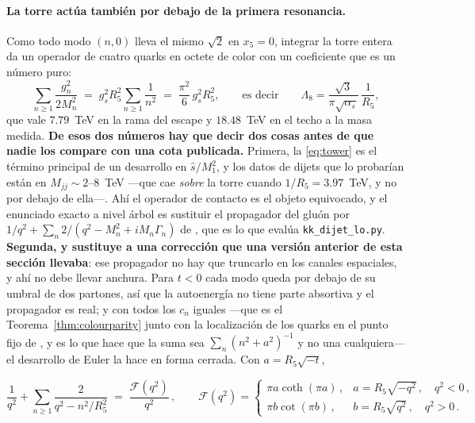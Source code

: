 \documentclass[11pt,a4paper]{article}
\newenvironment{keyeq}
  {\begin{center}\setlength{\fboxsep}{9pt}\setlength{\fboxrule}{0.8pt}%
   \begin{lrbox}{\keyeqbox}\begin{minipage}{0.88\textwidth}}
  {\end{minipage}\end{lrbox}%
   \fcolorbox{hdrblue!55}{hdrblue!6}{\usebox{\keyeqbox}}\end{center}}
\begin{document}
\paragraph{La torre actúa también por debajo de la primera resonancia.} Como todo modo $(n,0)$
lleva el mismo $\sqrt2$ en $x_5=0$, integrar la torre entera da un operador de cuatro quarks en
octete de color con un coeficiente que es un número puro:
\begin{equation}\label{eq:tower}
  \sum_{n\ge1}\frac{g_n^2}{2M_n^2}
  \;=\;g_s^2R_5^2\sum_{n\ge1}\frac{1}{n^2}
  \;=\;\frac{\pi^2}{6}\,g_s^2R_5^2 ,
  \qquad\text{es decir}\qquad
  \Lambda_8=\frac{\sqrt3}{\pi\sqrt{\alpha_s}}\,\frac{1}{R_5},
\end{equation}
que vale $7.79$~TeV en la rama del escape y $18.48$~TeV en el techo a la masa medida.
\textbf{De esos dos números hay que decir dos cosas antes de que nadie los compare con una cota
publicada.} Primera, la \eqref{eq:tower} es el término principal de un desarrollo en
$\hat s/M_1^2$, y los datos de dijets que lo probarían están en $M_{jj}\sim2$--$8$~TeV ---que cae
\emph{sobre} la torre cuando $1/R_5=3.97$~TeV, y no por debajo de ella---. Ahí el operador de contacto es el
objeto equivocado, y el enunciado exacto a nivel árbol es sustituir el propagador del gluón por
$1/q^2+\sum_n 2/(q^2-M_n^2+iM_n\Gamma_n)$ de \cite{DMN01}, que es lo que evalúa
\texttt{kk\_\allowbreak dijet\_\allowbreak lo.py}. \textbf{Segunda, y sustituye a una corrección
que una versión anterior de esta sección llevaba}: ese propagador no hay que truncarlo en los
canales espaciales, y ahí no debe llevar anchura. Para $t<0$ cada modo queda por debajo de su
umbral de dos partones, así que la autoenergía no tiene parte absortiva y el propagador es real; y
con todos los $c_n$ iguales ---que es el Teorema~\ref{thm:colourparity} junto con la localización
de los quarks en el punto fijo de \cite{KM25}, y es lo que hace que la suma sea
$\sum_n(n^2+a^2)^{-1}$ y no una cualquiera--- el desarrollo de Euler la hace en forma cerrada. Con
$a=R_5\sqrt{-t}$,
\begin{keyeq}
\begin{equation}\label{eq:resum}
  \frac{1}{q^2}+\sum_{n\ge1}\frac{2}{q^2-n^2/R_5^2}\;=\;\frac{\mathcal F(q^2)}{q^2}\,,\qquad
  \mathcal F(q^2)=
  \begin{cases}
    \pi a\coth(\pi a)\,, & a=R_5\sqrt{-q^2}\,,\quad q^2<0\,,\\[2pt]
    \pi b\cot(\pi b)\,,  & b=R_5\sqrt{q^2}\,,\quad q^2>0\,.
  \end{cases}
\end{equation}
\end{keyeq}
\end{document}
